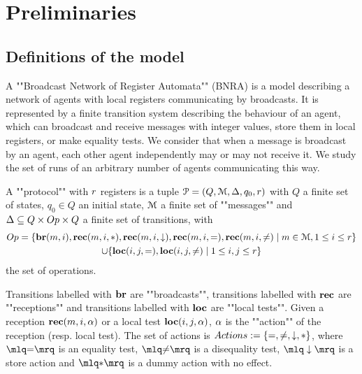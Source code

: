 \section{Preliminaries}
\label{sec:preliminaries}

\subsection{Definitions of the model}
A ""Broadcast Network of Register Automata"" (BNRA) \cite{DST2013} is a model describing a network of agents with local registers communicating by broadcasts. It is represented by a finite transition system describing the behaviour of an agent, which can broadcast and receive messages with integer values, store them in local registers, or make equality tests. 
We consider that when a message is broadcast by an agent, each other agent independently may or may not receive it. 
We study the set of runs of an arbitrary number of agents communicating this way.

\begin{definition}[Protocols]
	A ""protocol"" with $r$ registers is a tuple $\mathcal{P} = (Q, \mathcal{M}, \Delta, q_0, r)$  with $Q$ a finite set of states, $q_0 \in Q$ an initial state, $\mathcal{M}$ a finite set of ""messages""  and $\transitions \subseteq Q \times \operations \times Q$ a finite set of transitions, with 
	\begin{multline*}
	\operations = \set{\br{\amessage}{i}, \rec{\amessage}{i}{\dummyact}, \rec{\amessage}{i}{\enregact}, \rec{\amessage}{i}{\eqtestact}, \rec{\amessage}{i}{\diseqtestact} \mid \amessage \in \messages, 1 \leq i \leq \regnum} \\ \cup  
	\set{\loc{i}{j}{\eqtestact}, \loc{i}{j}{\diseqtestact} \mid 1 \leq i,j \leq \regnum}
	\end{multline*}
	the set of operations.
	
	Transitions labelled with $\textbf{br}$ are ""broadcasts"", transitions labelled with $\textbf{rec}$ are ""receptions"" and transitions labelled with $\textbf{loc}$ are ""local tests"".
	Given a reception $\textbf{rec}(m, i, \alpha)$ or a local test $\textbf{loc}(i,j,\alpha)$, $\alpha$ is the ""action"" of the reception (resp. local test). 
The set of actions is $\actions := \set{\eqtestact, \diseqtestact, \enregact, \dummyact}$, where 
$\quotemarks{\eqtestact}$ is an equality test, $\quotemarks{\diseqtestact}$ is a disequality test, $\quotemarks{\enregact}$ is a store action and $\quotemarks{\dummyact}$ is a dummy action with no effect.
\end{definition}

